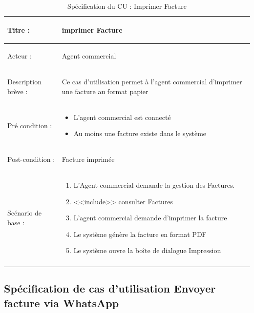 \begin{longtable}{|>{\bfseries\raggedright\arraybackslash}p{3.5cm}|p{\dimexpr\textwidth-3.5cm-4\tabcolsep-2\arrayrulewidth}|}
\hline
Titre : & imprimer Facture \\
\hline
Acteur : & Agent commercial \\
\hline
Description brève : & Ce cas d'utilisation permet à l'agent commercial d'imprimer une facture au format papier \\
\hline
Pré condition : &
\begin{itemize}[leftmargin=1.5em, topsep=0pt, itemsep=0pt, parsep=0pt]
  \item L'agent commercial est connecté
  \item Au moins une facture existe dans le système
\end{itemize} \\
\hline
Post-condition : & Facture imprimée \\
\hline
Scénario de base : &
\begin{enumerate}[leftmargin=1.5em, topsep=2pt, itemsep=1pt]
  \item L'Agent commercial demande la gestion des Factures.
  \item <<include>> consulter Factures
  \item L'agent commercial demande d'imprimer la facture
  \item Le système génère la facture en format PDF
  \item Le système ouvre la boîte de dialogue Impression
\end{enumerate} \\
\hline
\caption{Spécification du CU : Imprimer Facture}
\label{tab:cu-imprimer-facture}
\end{longtable}

\newpage
{}
\subsection{Spécification de cas d'utilisation Envoyer facture via WhatsApp}

